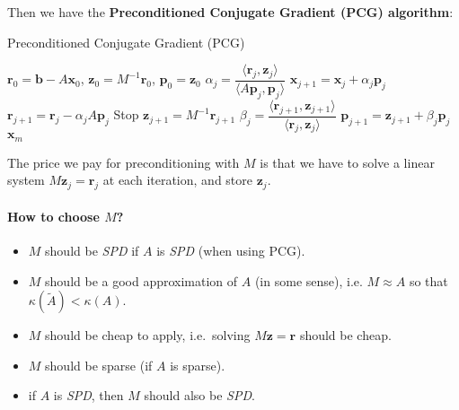 Then we have the \textbf{Preconditioned Conjugate Gradient (PCG) algorithm}:
\begin{algorithm}[H]
    \caption{Preconditioned Conjugate Gradient (PCG)}
    \begin{algorithmic}
        \State $\mathbf{r}_0 = \mathbf{b} - A \mathbf{x}_0$, $\mathbf{z}_0 = M^{-1} \mathbf{r}_0$, $\mathbf{p}_0 = \mathbf{z}_0$
        \State $\alpha_j = \dfrac{\langle \mathbf{r}_j, \mathbf{z}_j \rangle}{\langle A \mathbf{p}_j, \mathbf{p}_j \rangle}$
        \State $\mathbf{x}_{j+1} = \mathbf{x}_j + \alpha_j \mathbf{p}_j$
        \State $\mathbf{r}_{j+1} = \mathbf{r}_j - \alpha_j A \mathbf{p}_j$
        \State Stop
        \EndIf
        \State $\mathbf{z}_{j+1} = M^{-1} \mathbf{r}_{j+1}$
        \State $\beta_j = \dfrac{\langle \mathbf{r}_{j+1}, \mathbf{z}_{j+1} \rangle}{\langle \mathbf{r}_j, \mathbf{z}_j \rangle}$
        \State $\mathbf{p}_{j+1} = \mathbf{z}_{j+1} + \beta_j \mathbf{p}_j$
        \EndFor
        \Return $\mathbf{x}_m$
    \end{algorithmic}
\end{algorithm}

The price we pay for preconditioning with $M$ is that we have to solve a linear system $M \mathbf{z}_j = \mathbf{r}_j$ at each iteration, and store $\mathbf{z}_j$.

\paragraph{How to choose $M$?}
\begin{itemize}
    \item $M$ should be \emph{SPD} if $A$ is \emph{SPD} (when using PCG).
    \item $M$ should be a good approximation of $A$ (in some sense), i.e. $M \approx A$ so that $\kappa(\tilde{A}) < \kappa(A)$.
    \item $M$ should be cheap to apply, i.e.\ solving $M \mathbf{z} = \mathbf{r}$ should be cheap.
    \item $M$ should be sparse (if $A$ is sparse).
    \item if $A$ is \emph{SPD}, then $M$ should also be \emph{SPD}.
\end{itemize}

